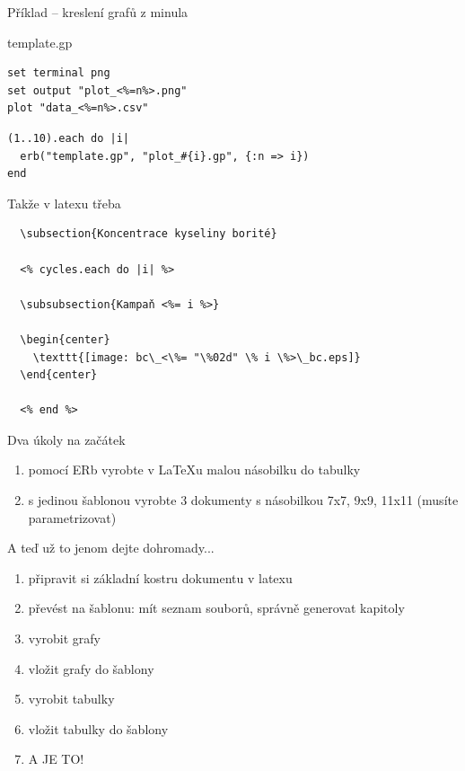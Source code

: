 \documentclass{beamer}
\begin{document}
\begin{frame}[fragile]{Příklad -- kreslení grafů z minula}
  \begin{block}{template.gp}
    \scriptsize
    \begin{verbatim}
set terminal png
set output "plot_<%=n%>.png"
plot "data_<%=n%>.csv"
    \end{verbatim}
  \end{block}
  \begin{block}{}
    \scriptsize
    \begin{verbatim}
(1..10).each do |i|
  erb("template.gp", "plot_#{i}.gp", {:n => i})
end
    \end{verbatim}
  \end{block}
\end{frame}

\begin{frame}[fragile]{Takže v latexu třeba}
\scriptsize
\begin{verbatim}
  \subsection{Koncentrace kyseliny borité}

  <% cycles.each do |i| %>

  \subsubsection{Kampaň <%= i %>}

  \begin{center}
    \texttt{[image: bc\_<\%= "\%02d" \% i \%>\_bc.eps]}
  \end{center}

  <% end %>
\end{verbatim}
\end{frame}

\begin{frame}{Dva úkoly na začátek}
  \begin{enumerate}
    \item pomocí ERb vyrobte v LaTeXu malou násobilku do tabulky
    \item s jedinou šablonou vyrobte 3 dokumenty s násobilkou 7x7, 9x9, 11x11 (musíte parametrizovat)
  \end{enumerate}
\end{frame}

\begin{frame}{A teď už to jenom dejte dohromady...}
  \begin{enumerate}
    \item připravit si základní kostru dokumentu v latexu
    \item převést na šablonu: mít seznam souborů, správně generovat kapitoly
    \item vyrobit grafy
    \item vložit grafy do šablony
    \item vyrobit tabulky
    \item vložit tabulky do šablony
    \item A JE TO!
  \end{enumerate}
\end{frame}
\end{document}
